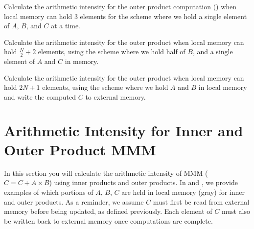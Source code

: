 \documentclass[a4 paper]{article}
\begin{document}
Calculate the arithmetic intensity for the outer product computation () when local memory can hold 3 elements for the scheme where we hold a single element of $A$, $B$, and $C$ at a time.


Calculate the arithmetic intensity for the outer product when local memory can hold $\frac{N}{2} + 2$ elements, using the scheme where we hold half of $B$, and a single element of $A$ and $C$ in memory.


Calculate the arithmetic intensity for the outer product when local memory can hold $2N + 1$ elements, using the scheme where we hold $A$ and $B$ in local memory and write the computed $C$ to external memory.



\section{Arithmetic Intensity for Inner and Outer Product MMM}
\label{sec:MMM_ai}
In this section you will calculate the arithmetic intensity of MMM ($C = C + A \times B$) using inner products and outer products. 
In  and , we provide examples of which portions of $A$, $B$, $C$ are held in local memory (gray) for inner and outer products.
As a reminder, we assume $C$ must first be read from external memory before being updated, as defined previously.
Each element of $C$ must also be written back to external memory once computations are complete.
\end{document}
